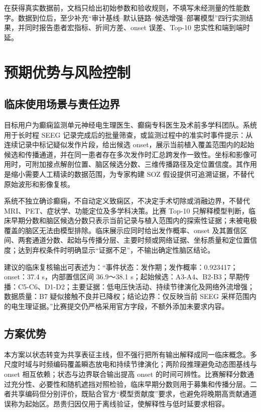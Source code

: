 在获得真实数据前，文档只给出初始参数和验收规则，不填写未经测量的性能数字。数据到位后，至少补充“审计基线--默认链路--候选增强--部署模型”四行实测结果，并同时报告患者宏指标、折间方差、onset 误差、Top-10 忠实性和端到端时延。

\clearpage
\section{预期优势与风险控制}

\subsection{临床使用场景与责任边界}

目标用户为癫痫监测单元神经电生理医生、癫痫专科医生及术前多学科团队。系统用于长时程 SEEG 记录完成后的批量筛查，或监测过程中的准实时事件提示：从连续记录中标记疑似发作片段，给出候选 onset，展示当前植入覆盖范围内的起始候选和传播通道，并在同一患者存在多次发作时汇总跨发作一致性。坐标和影像可用时，可附加接点解剖位置、脑区候选分数、三维传播路径及定位置信度。其作用是缩小需要人工精读的数据范围，为专家构建 SOZ 假设提供可追溯证据，不替代原始波形和影像复核。

系统不独立确诊癫痫，不自动定义致痫区，不决定手术切除或消融边界，不替代 MRI、PET、症状学、功能定位及多学科决策。比赛 Top-10 只解释模型判断，临床早期分数和脑区候选分数只表示当前记录与植入范围内的探索性证据；未被电极覆盖的脑区无法由模型排除。临床展示应同时给出发作概率、onset 及其置信区间、两套通道分数、起始与传播分层、主要时频或网络证据、坐标质量和定位置信度；达到弃权条件时明确显示“证据不足”，不输出确定性脑区结论。

建议的临床复核输出可表述为：“事件状态：发作期；发作概率：0.923417；onset：37.4 s，内部置信区间 36.9～38.1 s；起始候选：A3-A4、B2-B3；早期传播：C5-C6、D1-D2；主要证据：低电压快活动、持续节律演化及网络外流增强；数据质量：B7 疑似接触不良并已降权；结论边界：仅反映当前 SEEG 采样范围内的电生理证据。”比赛提交仍严格采用官方字段，不额外添加未要求内容。

\subsection{方案优势}

本方案以状态转变为共享表征主线，但不强行把所有输出解释成同一临床概念。多尺度时域与时频编码覆盖瞬态放电和持续节律演化；两阶段推理避免动态图基线与 onset 相互依赖；状态与边界联合输出提高 onset 的时间可辨性。比赛解释分数通过充分性、必要性和随机遮挡对照检验，临床早期分数则用于募集和传播分层。二者共享编码但分别评价，既贴合官方“模型贡献度”要求，也避免将晚期高贡献通道误称为起始区。昂贵归因仅用于离线验证，使解释性与低时延要求相容。

